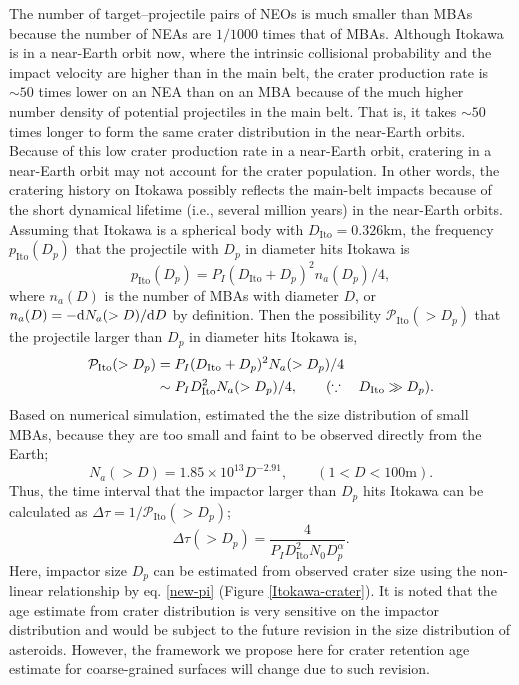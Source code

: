 \documentclass[3p,authoryear]{elsarticle}
\begin{document}
The number of target--projectile pairs of NEOs is much smaller than MBAs because the number of NEAs are $1/1000$ times that of MBAs.
Although Itokawa is in a near-Earth orbit now, where the intrinsic collisional probability and the impact velocity are higher than in the main belt,
the crater production rate is $\sim 50$ times lower on an NEA than on an MBA because of the much higher number density of potential projectiles in the main belt.
That is, it takes $\sim 50$ times longer to form the same crater distribution in the near-Earth orbits.
Because of this low crater production rate in a near-Earth orbit, cratering in a near-Earth orbit may not account for the crater population.
In other words, the cratering history on Itokawa possibly reflects the main-belt impacts because of the short dynamical lifetime (i.e., several million years) in the near-Earth orbits.
Assuming that Itokawa is a spherical body with $D_\text{Ito}=0.326$km, the frequency $p_\text{Ito}(D_p)$ that the projectile with $D_p$ in diameter hits Itokawa is
\begin{equation}
	p_\text{Ito}(D_p) = P_I(D_\text{Ito}+D_p)^2n_a(D_p)/4,
\end{equation}
where $n_a(D)$ is the number of MBAs with diameter $D$, or $n_a(D)=-{\rm d} N_a(>D)/{\rm d} D$ by definition.
Then the possibility $\mathcal{P}_\text{Ito}(>D_p)$ that the projectile larger than $D_p$ in diameter hits Itokawa is,
\begin{align}
	\mathcal{P}_\text{Ito}(>D_p) &= P_I(D_\text{Ito}+D_p)^2N_a(>D_p)/4 \notag\\
	&\sim P_I D_\text{Ito}^2N_a(>D_p)/4,\qquad (\because\quad D_\text{Ito} \gg D_p).
\end{align}
Based on numerical simulation, \citet{obrien2005} estimated the the size distribution of small MBAs, because they are too small and faint to be observed directly from the Earth;
\begin{equation}
	N_a(>D)=1.85\times 10^{13}D^{-2.91},\qquad (1<D<100\text{m}).
\end{equation}
Thus, the time interval that the impactor larger than $D_p$ hits Itokawa can be calculated as $\Delta \tau =1/\mathcal{P}_\text{Ito}(>D_p)$;
\begin{equation}
	\Delta \tau(>D_p) = \frac{4}{P_ID_\text{Ito}^2N_0 D_p^{\alpha}}.
\end{equation}
Here, impactor size $D_p$ can be estimated from observed crater size using the non-linear relationship by eq. \ref{new-pi} (Figure \ref{Itokawa-crater}).
It is noted that the age estimate from crater distribution is very sensitive on the impactor distribution and would be subject to the future revision in the size distribution of asteroids. However, the framework we propose here for crater retention age estimate for coarse-grained surfaces will change due to such revision.
\end{document}
